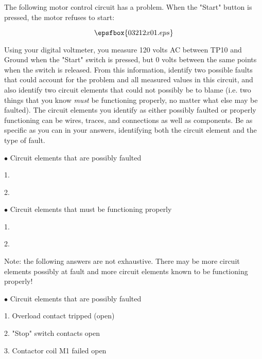 

The following motor control circuit has a problem.  When the "Start" button is pressed, the motor refuses to start:

$$\epsfbox{03212x01.eps}$$

Using your digital voltmeter, you measure 120 volts AC between TP10 and Ground when the "Start" switch is pressed, but 0 volts between the same points when the switch is released.  From this information, identify two possible faults that could account for the problem and all measured values in this circuit, and also identify two circuit elements that could not possibly be to blame (i.e. two things that you know {\it must} be functioning properly, no matter what else may be faulted).  The circuit elements you identify as either possibly faulted or properly functioning can be wires, traces, and connections as well as components.  Be as specific as you can in your answers, identifying both the circuit element and the type of fault.

\medskip
\goodbreak
\item{$\bullet$} Circuit elements that are possibly faulted
\item{1.}
\item{2.} 
\medskip

\medskip
\goodbreak
\item{$\bullet$} Circuit elements that must be functioning properly
\item{1.} 
\item{2.} 
\medskip







Note: the following answers are not exhaustive.  There may be more circuit elements possibly at fault and more circuit elements known to be functioning properly!

\medskip
\goodbreak
\item{$\bullet$} Circuit elements that are possibly faulted
\item{1.} Overload contact tripped (open)
\item{2.} "Stop" switch contacts open
\item{3.} Contactor coil M1 failed open
\medskip

